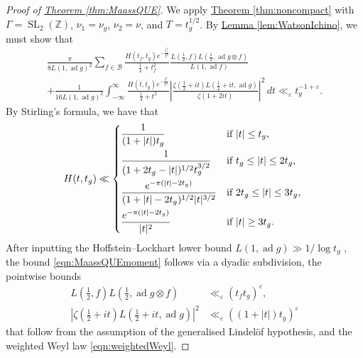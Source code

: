 \documentclass[11pt,a4paper]{amsart}
\newcommand{\BB}{\mathcal{B}}
\newcommand{\e}{\varepsilon}
\newcommand{\Z}{\mathbb{Z}}
\DeclareMathOperator{\ad}{ad}
\DeclareMathOperator{\SL}{SL}
\numberwithin{equation}{section}
\theoremstyle{remark}
\theoremstyle{definition}
\begin{document}
\begin{proof}[Proof of {\hyperref[thm:MaassQUE]{Theorem \ref*{thm:MaassQUE}}}]
We apply \hyperref[thm:noncompact]{Theorem \ref*{thm:noncompact}} with $\Gamma = \SL_2(\Z)$, $\nu_1 = \nu_g$, $\nu_2 = \nu$, and $T = t_g^{1/2}$. By \hyperref[lem:WatsonIchino]{Lemma \ref*{lem:WatsonIchino}}, we must show that
\begin{multline}
\label{eqn:MaassQUEmoment}
\frac{\pi}{8 L(1,\ad g)^2} \sum_{f \in \BB} \frac{H(t_f,t_g) e^{-\frac{t_f^2}{T^2}}}{\frac{1}{4} + t_f^2} \frac{L\left(\frac{1}{2},f\right) L\left(\frac{1}{2},\ad g \otimes f\right)}{L(1,\ad f)}	\\
+ \frac{1}{16 L(1,\ad g)^2} \int_{-\infty}^{\infty} \frac{H(t,t_g) e^{-\frac{t^2}{T^2}}}{\frac{1}{4} + t^2} \left|\frac{\zeta\left(\frac{1}{2} + it\right) L\left(\frac{1}{2} + it,\ad g\right)}{\zeta(1 + 2it)}\right|^2 \, dt \ll_{\e} t_g^{-1 + \e}.
\end{multline}
By Stirling's formula, we have that
\[H(t,t_g) \ll \begin{dcases*}
\frac{1}{(1 + |t|) t_g} & if $|t| \leq t_g$,	\\
\frac{1}{(1 + 2t_g - |t|)^{1/2} t_g^{3/2}} & if $t_g \leq |t| \leq 2t_g$,	\\
\frac{e^{-\pi(|t| - 2t_g)}}{(1 + |t| - 2t_g)^{1/2} |t|^{3/2}} & if $2t_g \leq |t| \leq 3t_g$,	\\
\frac{e^{-\pi(|t| - 2t_g)}}{|t|^2} & if $|t| \geq 3t_g$.
\end{dcases*}\]
After inputting the Hoffstein--Lockhart lower bound $L(1,\ad g) \gg 1/\log t_g$ \cite{HL94}, the bound \eqref{eqn:MaassQUEmoment} follows via a dyadic subdivision, the pointwise bounds
\begin{align*}
L\left(\frac{1}{2},f\right) L\left(\frac{1}{2},\ad g \otimes f\right) & \ll_{\e} (t_f t_g)^{\e},	\\
\left|\zeta\left(\frac{1}{2} + it\right) L\left(\frac{1}{2} + it,\ad g\right)\right|^2 & \ll_{\e} ((1 + |t|) t_g)^{\e}
\end{align*}
that follow from the assumption of the generalised Lindel\"{o}f hypothesis, and the weighted Weyl law \eqref{eqn:weightedWeyl}.
\end{proof}
\end{document}
